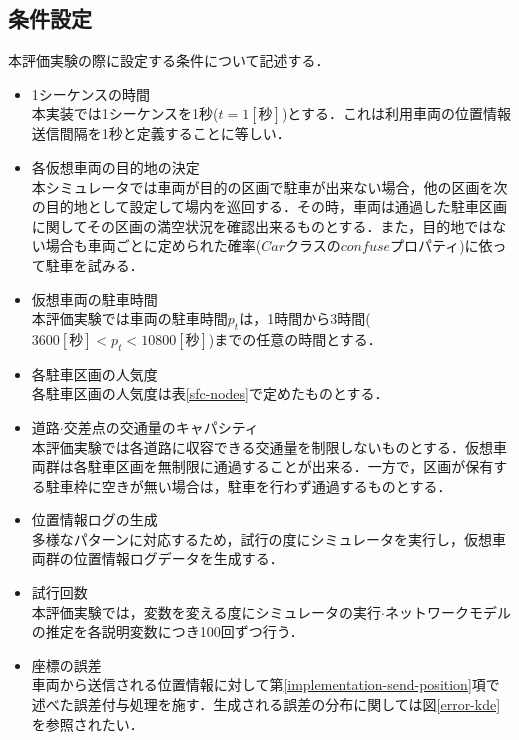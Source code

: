 \subsection{条件設定}
\label{evaluation-test-conditions}
本評価実験の際に設定する条件について記述する．

\begin{itemize}
	\item 1シーケンスの時間 \\
	      本実装では1シーケンスを1秒($t = 1[秒]$)とする．これは利用車両の位置情報送信間隔を1秒と定義することに等しい．
	\item 各仮想車両の目的地の決定\\
	      本シミュレータでは車両が目的の区画で駐車が出来ない場合，他の区画を次の目的地として設定して場内を巡回する．その時，車両は通過した駐車区画に関してその区画の満空状況を確認出来るものとする．また，目的地ではない場合も車両ごとに定められた確率($Car$クラスの$confuse$プロパティ)に依って駐車を試みる．
	\item 仮想車両の駐車時間 \\
	      本評価実験では車両の駐車時間$p_t$は，1時間から3時間($3600[秒] < p_t < 10800[秒]$)までの任意の時間とする．
	\item 各駐車区画の人気度\\
	      各駐車区画の人気度は表\ref{sfc-nodes}で定めたものとする．
	\item 道路$\cdot$交差点の交通量のキャパシティ \\
	      本評価実験では各道路に収容できる交通量を制限しないものとする．仮想車両群は各駐車区画を無制限に通過することが出来る．一方で，区画が保有する駐車枠に空きが無い場合は，駐車を行わず通過するものとする．
	      	
	\item 位置情報ログの生成 \\
	      多様なパターンに対応するため，試行の度にシミュレータを実行し，仮想車両群の位置情報ログデータを生成する．
	\item 試行回数 \\
	      本評価実験では，変数を変える度にシミュレータの実行$\cdot$ネットワークモデルの推定を各説明変数につき100回ずつ行う．
	\item 座標の誤差 \\
	      車両から送信される位置情報に対して第\ref{implementation-send-position}項で述べた誤差付与処理を施す．生成される誤差の分布に関しては図\ref{error-kde}を参照されたい．
	      	
\end{itemize}


